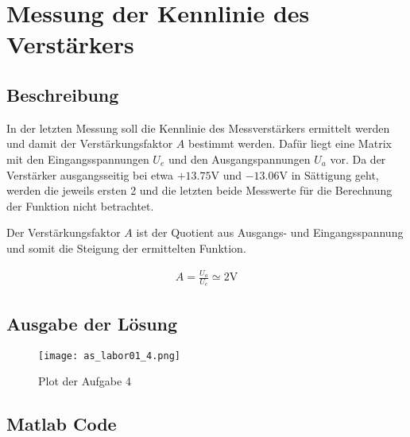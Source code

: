 \section{Messung der Kennlinie des Verstärkers}

\subsection{Beschreibung}

In der letzten Messung soll die Kennlinie des Messverstärkers ermittelt
werden und damit der Verstärkungsfaktor $A$ bestimmt werden. Dafür liegt
eine Matrix mit den Eingangsspannungen $U_e$ und den Ausgangspannungen
$U_a$ vor. Da der Verstärker ausgangsseitig bei etwa $+13.75\mathrm{V}$
und $-13.06\mathrm{V}$ in Sättigung geht, werden die jeweils ersten 2
und die letzten beide Messwerte für die Berechnung der Funktion nicht
betrachtet.

Der Verstärkungsfaktor $A$ ist der Quotient aus Ausgangs- und Eingangsspannung
und somit die Steigung der ermittelten Funktion.

\begin{equation} \label{eq141}
    \begin{split}
        A=\frac{U_a}{U_e}\simeq2 \mathrm{V}
    \end{split}
\end{equation}



\subsection{Ausgabe der Lösung}
\begin{figure}[H]
 \centering
 \texttt{[image: as\_labor01\_4.png]}
 \caption{Plot der Aufgabe 4}
 \label{fig:PlotAufgabe4}
\end{figure}

\subsection{Matlab Code}

